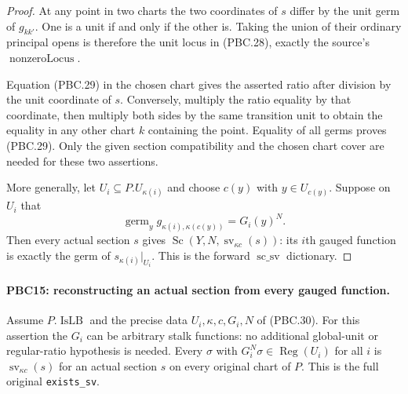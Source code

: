 \documentclass[11pt,a4paper]{article}
\numberwithin{equation}{section}
\theoremstyle{remark}\newtheorem{remark}[theorem]{Remark}
\begin{document}
\begin{proof}
At any point in two charts the two coordinates of $s$ differ
by the unit germ of $g_{kk'}$.  One is a unit if and only if
the other is.  Taking the union of their ordinary principal
opens is therefore the unit locus in (PBC.28), exactly the
source's $\operatorname{nonzeroLocus}$.

Equation (PBC.29) in the chosen chart gives the asserted ratio
after division by the unit coordinate of $s$.
Conversely, multiply the ratio equality by that coordinate,
then multiply both sides by the same transition unit to obtain
the equality in any other chart $k$ containing the point.
Equality of all germs proves (PBC.29).
Only the given section compatibility and the chosen chart cover
are needed for these two assertions.

More generally, let $U_i\subseteq P.U_{\kappa(i)}$ and choose
$c(y)$ with $y\in U_{c(y)}$.  Suppose on $U_i$ that
\[
 \operatorname{germ}_y g_{\kappa(i),\kappa(c(y))}
      =G_i(y)^N.
                                                        \tag{PBC.30}
\]
Then every actual section $s$ gives
$\operatorname{Sc}(Y,N,\operatorname{sv}_{\kappa c}(s))$:
its $i$th gauged function is exactly the germ of
$s_{\kappa(i)}|_{U_i}$.  This is the forward
$\operatorname{sc\_\allowbreak sv}$ dictionary.
\end{proof}

\paragraph{PBC15: reconstructing an actual section from every gauged function.}
\label{claim:PBC15}
Assume $P.\operatorname{IsLB}$ and the precise data
$U_i,\kappa,c,G_i,N$ of (PBC.30).  For this assertion the
$G_i$ can be arbitrary stalk functions: no additional
global-unit or regular-ratio hypothesis is needed.
Every $\sigma$ with
$G_i^N\sigma\in\operatorname{Reg}(U_i)$ for all $i$ is
$\operatorname{sv}_{\kappa c}(s)$ for an actual section
$s$ on every original chart of $P$.
This is the full original \texttt{exists\_\allowbreak sv}.
\end{document}
